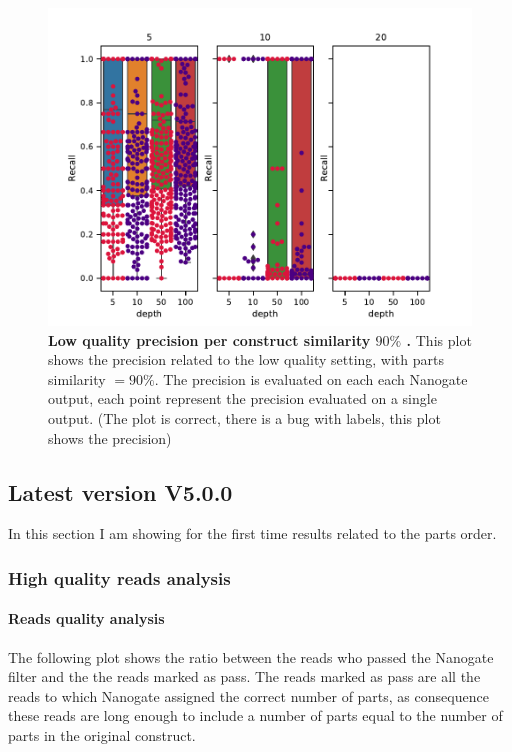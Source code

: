 \documentclass[11pt, a4paper]{article}
\begin{document}
 \begin{figure}[ht]
    \begin{center}
    \includegraphics[width=1.35\textwidth]{../results/images_notebook/v_460/lq_sim_90_recall_per_result.pdf}
    \end{center}
    \caption{{\bf Low quality precision per construct similarity $90\%$ .}  This plot shows the precision related to the low quality setting, with parts similarity $=90\%$. The precision is evaluated on each each Nanogate output, each point represent the precision evaluated on a single output. (The plot is correct, there is a bug with labels, this plot shows the precision)}
   \label{fig:v_460_lq_sim_90_precision_per_result}
\end{figure}

\clearpage
\subsection{Latest version V5.0.0 }
In this section I am showing for the first time results related to the parts order.

\subsubsection{High quality reads analysis}
\paragraph{Reads quality analysis}
The following plot shows the ratio between the reads who passed the Nanogate filter and the the reads marked as pass.
The reads marked as pass are all the reads to which Nanogate assigned the correct number of parts, as consequence these reads are long enough to include a number of parts equal to the number of parts in the original construct.
\end{document}
